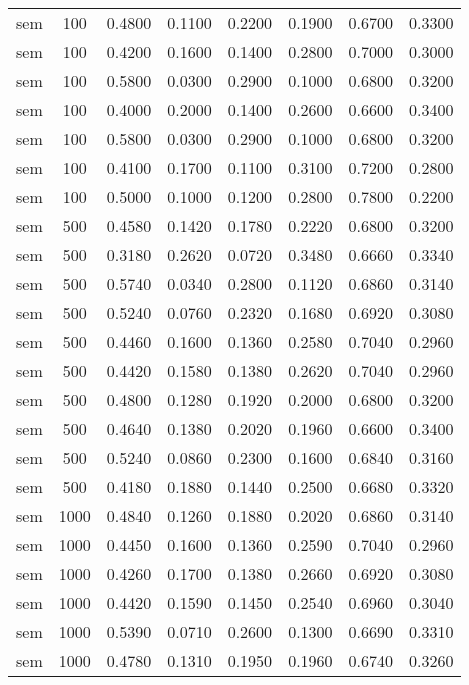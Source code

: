\begin{scriptsize}
\begin{longtable}{cccccccc}
		sem      & 100  & 0.4800 & 0.1100 & 0.2200 & 0.1900 & 0.6700 & 0.3300 \\
		sem      & 100  & 0.4200 & 0.1600 & 0.1400 & 0.2800 & 0.7000 & 0.3000 \\
		sem      & 100  & 0.5800 & 0.0300 & 0.2900 & 0.1000 & 0.6800 & 0.3200 \\
		sem      & 100  & 0.4000 & 0.2000 & 0.1400 & 0.2600 & 0.6600 & 0.3400 \\
		sem      & 100  & 0.5800 & 0.0300 & 0.2900 & 0.1000 & 0.6800 & 0.3200 \\
		sem      & 100  & 0.4100 & 0.1700 & 0.1100 & 0.3100 & 0.7200 & 0.2800 \\
		sem      & 100  & 0.5000 & 0.1000 & 0.1200 & 0.2800 & 0.7800 & 0.2200 \\
		sem      & 500  & 0.4580 & 0.1420 & 0.1780 & 0.2220 & 0.6800 & 0.3200 \\
		sem      & 500  & 0.3180 & 0.2620 & 0.0720 & 0.3480 & 0.6660 & 0.3340 \\
		sem      & 500  & 0.5740 & 0.0340 & 0.2800 & 0.1120 & 0.6860 & 0.3140 \\
		sem      & 500  & 0.5240 & 0.0760 & 0.2320 & 0.1680 & 0.6920 & 0.3080 \\
		sem      & 500  & 0.4460 & 0.1600 & 0.1360 & 0.2580 & 0.7040 & 0.2960 \\
		sem      & 500  & 0.4420 & 0.1580 & 0.1380 & 0.2620 & 0.7040 & 0.2960 \\
		sem      & 500  & 0.4800 & 0.1280 & 0.1920 & 0.2000 & 0.6800 & 0.3200 \\
		sem      & 500  & 0.4640 & 0.1380 & 0.2020 & 0.1960 & 0.6600 & 0.3400 \\
		sem      & 500  & 0.5240 & 0.0860 & 0.2300 & 0.1600 & 0.6840 & 0.3160 \\
		sem      & 500  & 0.4180 & 0.1880 & 0.1440 & 0.2500 & 0.6680 & 0.3320 \\
		sem      & 1000 & 0.4840 & 0.1260 & 0.1880 & 0.2020 & 0.6860 & 0.3140 \\
		sem      & 1000 & 0.4450 & 0.1600 & 0.1360 & 0.2590 & 0.7040 & 0.2960 \\
		sem      & 1000 & 0.4260 & 0.1700 & 0.1380 & 0.2660 & 0.6920 & 0.3080 \\
		sem      & 1000 & 0.4420 & 0.1590 & 0.1450 & 0.2540 & 0.6960 & 0.3040 \\
		sem      & 1000 & 0.5390 & 0.0710 & 0.2600 & 0.1300 & 0.6690 & 0.3310 \\
		sem      & 1000 & 0.4780 & 0.1310 & 0.1950 & 0.1960 & 0.6740 & 0.3260 \\

\end{longtable}
\end{scriptsize}
